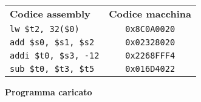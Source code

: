 \documentclass[../main.tex]{subfiles}
\begin{document}
\begin{table}[h!]
    \dashlinegap=2pt

    \begin{minipage}{.5\linewidth}
        \hspace*{-4.4mm}
        \setlength{\tabcolsep}{6pt}
        \begin{tabular}{ l c }
            \\
            \textbf{Codice assembly} & \textbf{Codice macchina} \\
            \texttt{lw \hspace*{0pt} \hspace*{0pt} \$t2, 32(\$0)} & \texttt{0x8C0A0020} \\
            \texttt{add \hspace*{0pt} \$s0, \$s1, \$s2} & \texttt{0x02328020} \\
            \texttt{addi \$t0, \$s3, -12} & \texttt{0x2268FFF4} \\
            \texttt{sub \hspace*{0pt} \$t0, \$t3, \$t5} & \texttt{0x016D4022} \\
        \end{tabular}
    \end{minipage}
    \begin{minipage}{.03\linewidth}
    \end{minipage}
    \begin{minipage}{.44\linewidth}
        \centering

        \textbf{Programma caricato}

        \begin{mdframed}[roundcorner=10pt]
\end{mdframed}
\end{minipage}
\end{table}
\end{document}
